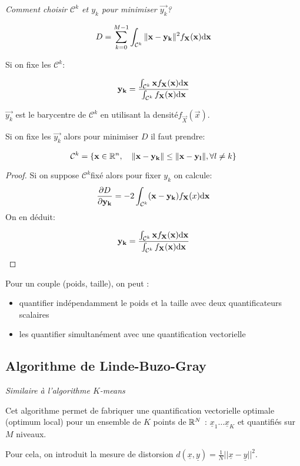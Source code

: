 \documentclass[main.tex]{subfiles}
\begin{document}
\emph{Comment choisir $\mathcal{C}^k$ et $y_k$ pour minimiser $\vec{y_k}$?
}

\[
  D = \sum_{k=0}^{M-1}\int_{\mathcal{C}^k} \|\vec{x}-\vec{y_k}\|^2 f_\vec{X}(\vec{x})\d \vec{x}
\]
\begin{prop}

  Si on fixe les $\mathcal{C}^k$:

\[
  \vec{y_k} = \frac{\int_{\mathcal{C}^k}\vec{x}f_{\vec{X}}(\vec{x})\d\vec{x}}{\int_{\mathcal{C}^k}f_{\vec{X}}(\vec{x})\d\vec{x}}
\]


$  \vec{y_k}$ est le barycentre de $\mathcal{C}^k$ en utilisant la densité$f_{\vec{X}}(\vec{x})$.

Si on fixe les $\vec{y_k}$ alors pour minimiser $D$ il faut prendre:

\[
  \mathcal{C}^k =\{ \vec{x}\in\R^n ,\quad\|\vec{x}-\vec{y_k}\| \le \|\vec{x}-\vec{y_l}\| , \forall l \neq k\}
\]
\end{prop}
\begin{proof}

Si on suppose $\mathcal{C}^k$fixé alors pour fixer $y_k$ on calcule:
\[
  \derivp[D]{\vec{y_k}} = -2 \int_{\mathcal{C}^k} (\vec{x}-\vec{y_k})f_{\vec{X}}(x)\d\vec{x}
\]
On en déduit:

\[
  \vec{y_k} = \frac{\int_{\mathcal{C}^k}\vec{x}f_{\vec{X}}(\vec{x})\d\vec{x}}{\int_{\mathcal{C}^k}f_{\vec{X}}(\vec{x})\d\vec{x}}
\]
\end{proof}



Pour un couple (poids, taille), on peut :
\begin{itemize}
\item quantifier indépendamment le poids et la taille avec deux quantificateurs scalaires
\item les quantifier simultanément avec une quantification vectorielle
\end{itemize}

\subsection{Algorithme de Linde-Buzo-Gray}
\emph{Similaire à l'algorithme $K$-means}

\newcommand{\x}{\underline{x}}
Cet algorithme permet de fabriquer une quantification vectorielle optimale (optimum local) pour un ensemble de $K$ points de $\R^N$ : $\x_1 \dots \x_K$ et quantifiés sur $M$ niveaux.

\newcommand{\y}{\underline{y}}
Pour cela, on introduit la mesure de distorsion $d(\x,\y) = \frac{1}{N}||\x-\y||^2$.
\end{document}

